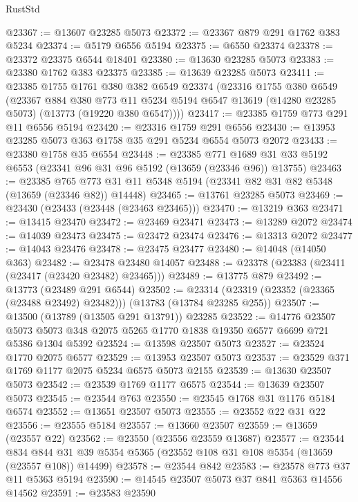 \begin{lexlean}{RustStd}
\begin{coremodule}
@23367 := @13607 @23285 @5073
@23372 := @23367 @879 @291 @1762 @383 @5234
@23374 := @5179 @6556 @5194
@23375 := @6550 @23374
@23378 := @23372 @23375 @6544 @18401
@23380 := @13630 @23285 @5073
@23383 := @23380 @1762 @383 @23375
@23385 := @13639 @23285 @5073
@23411 := @23385
    @1755
    @1761
    @380
    @382
    @6549
    @23374
    (@23316
      @1755
      @380
      @6549
      (@23367
        @884
        @380
        @773
        @11
        @5234
        @5194
        @6547
        @13619
        (@14280 @23285 @5073)
        (@13773 (@19220 @380 @6547))))
@23417 := @23385 @1759 @773 @291 @11 @6556 @5194
@23420 := @23316 @1759 @291 @6556
@23430 := @13953 @23285 @5073 @363 @1758 @35 @291 @5234 @6554 @5073 @2072
@23433 := @23380 @1758 @35 @6554
@23448 := @23385
    @771
    @1689
    @31
    @33
    @5192
    @6553
    (@23341 @96 @31 @96 @5192 (@13659 (@23346 @96)) @13755)
@23463 := @23385
    @765
    @773
    @31
    @11
    @5348
    @5194
    (@23341 @82 @31 @82 @5348 (@13659 (@23346 @82)) @14448)
@23465 := @13761 @23285 @5073
@23469 := @23430 (@23433 (@23448 (@23463 @23465)))
@23470 := @13219 @363
@23471 := @13415 @23470
@23472 := @23469 @23471
@23473 := @13289 @2072
@23474 := @14039 @23473
@23475 := @23472 @23474
@23476 := @13313 @2072
@23477 := @14043 @23476
@23478 := @23475 @23477
@23480 := @14048 (@14050 @363)
@23482 := @23478 @23480 @14057
@23488 := @23378 (@23383 (@23411 (@23417 (@23420 @23482) @23465)))
@23489 := @13775 @879
@23492 := @13773 (@23489 @291 @6544)
@23502 := @23314 (@23319 (@23352 (@23365 (@23488 @23492) @23482))) (@13783 (@13784 @23285 @255))
@23507 := @13500 (@13789 (@13505 @291 @13791)) @23285
@23522 := @14776
    @23507
    @5073
    @5073
    @348
    @2075
    @5265
    @1770
    @1838
    @19350
    @6577
    @6699
    @721
    @5386
    @1304
    @5392
@23524 := @13598 @23507 @5073
@23527 := @23524 @1770 @2075 @6577
@23529 := @13953 @23507 @5073
@23537 := @23529 @371 @1769 @1177 @2075 @5234 @6575 @5073 @2155
@23539 := @13630 @23507 @5073
@23542 := @23539 @1769 @1177 @6575
@23544 := @13639 @23507 @5073
@23545 := @23544 @763
@23550 := @23545 @1768 @31 @1176 @5184 @6574
@23552 := @13651 @23507 @5073
@23555 := @23552 @22 @31 @22
@23556 := @23555 @5184
@23557 := @13660 @23507
@23559 := @13659 (@23557 @22)
@23562 := @23550 (@23556 @23559 @13687)
@23577 := @23544
    @834
    @844
    @31
    @39
    @5354
    @5365
    (@23552 @108 @31 @108 @5354 (@13659 (@23557 @108)) @14499)
@23578 := @23544 @842
@23583 := @23578 @773 @37 @11 @5363 @5194
@23590 := @14545 @23507 @5073 @37 @841 @5363 @14556 @14562
@23591 := @23583 @23590

\end{coremodule}
\end{lexlean}
